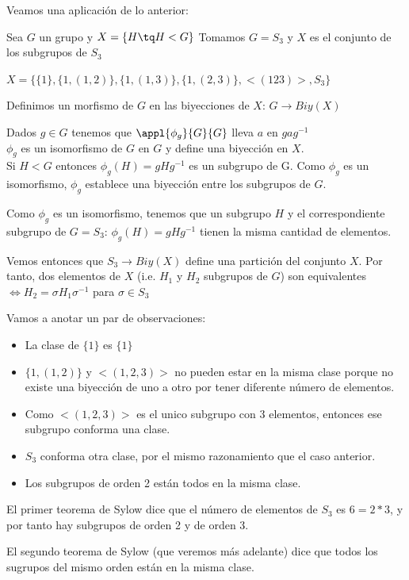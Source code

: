 \documentclass{apuntes}
\begin{document}
Veamos una aplicación de lo anterior:

\begin{example}
Sea $G$ un grupo y $X = \{ H\tq H<G\} $
Tomamos $G = S_3$ y $X$ es el conjunto de los subgrupos de $S_3$

$X = \{ \{1 \}, \{1, (1,2) \}, \{1, (1,3) \}, \{1, (2,3) \}, <(123)>, S_3 \}$

Definimos un morfismo de $G$ en las biyecciones de $X$: $G\longrightarrow Biy(X)$

Dados $g\in G$ tenemos que $\appl{\phi_g}{G}{G}$ lleva $a$ en $gag^{-1}$\\
$\phi _g$ es un isomorfismo de $G$ en $G$ y define una biyección en $X$.\\
Si $H<G$ entonces $\phi _g(H) = gHg^{-1}$ es un subgrupo de G. Como $\phi_g$ es un isomorfismo, $\phi _g$ establece una biyección entre los subgrupos de $G$.

Como $\phi _g$ es un isomorfismo, tenemos que un subgrupo $H$ y el correspondiente subgrupo de $G=S_3$: $\phi _g(H) = gHg^{-1}$ tienen la misma cantidad de elementos.

Vemos entonces que $S_3 \longrightarrow Biy(X)$ define una partición del conjunto $X$.
Por tanto, dos elementos de $X$ (i.e. $H_1$ y $H_2$ subgrupos de $G$) son equivalentes $\iff H_2 = \sigma H_1 \sigma^{-1}$ para $\sigma \in S_3$

Vamos a anotar un par de observaciones:\\
\begin{itemize}
\item La clase de $\{ 1\}$ es $\{ 1\}$
\item $\{ 1, (1,2)\}$ y $<(1,2,3)>$ no pueden estar en la misma clase porque no existe una biyección de uno a otro por tener diferente número de elementos.
\item Como $<(1,2,3)>$ es el unico subgrupo con 3 elementos, entonces ese subgrupo conforma una clase.
\item $S_3$ conforma otra clase, por el mismo razonamiento que el caso anterior.
\item Los subgrupos de orden 2 están todos en la misma clase.
\end{itemize}

El primer teorema de Sylow dice que el número de elementos de $S_3$ es $6=2*3$, y por tanto hay subgrupos de orden 2 y de orden 3.

El segundo teorema de Sylow (que veremos más adelante) dice que todos los sugrupos del mismo orden están en la misma clase.
\end{example}

\newpage
\printindex
\end{document}
